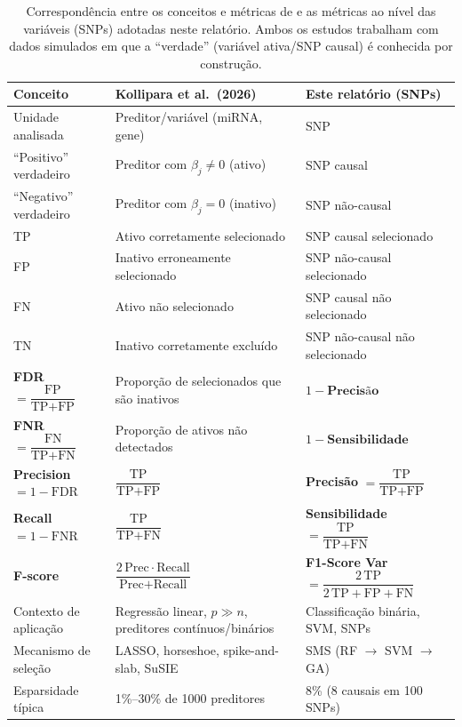 \documentclass[
    12pt,
    a4paper,
    oneside,
    english,
    french,
    spanish,
    brazil
    ]{abntex2}
\renewcommand{\arraystretch}{1.3}
\newcommand{\novo}[1]{\textcolor{corNova}{#1}}
\begin{document}
\begin{table}[H]
\centering
\caption{\novo{Correspondência entre os conceitos e métricas de \citeonline{Kollipara2026} e as métricas ao nível das variáveis (SNPs) adotadas neste relatório. Ambos os estudos trabalham com dados simulados em que a ``verdade'' (variável ativa/SNP causal) é conhecida por construção.}}
\label{tab:analogia_kollipara}
\small
\renewcommand{\arraystretch}{1.4}
\begin{tabular}{L{3.8cm}L{4.8cm}L{4.8cm}}
\hline
\textbf{Conceito} & \textbf{Kollipara et al.\ (2026)} & \textbf{Este relatório (SNPs)} \\
\hline
Unidade analisada & Preditor/variável (miRNA, gene) & SNP \\
\hline
``Positivo'' verdadeiro & Preditor com $\beta_j \neq 0$ (ativo) & SNP causal \\
\hline
``Negativo'' verdadeiro & Preditor com $\beta_j = 0$ (inativo) & SNP não-causal \\
\hline
TP & Ativo corretamente selecionado & SNP causal selecionado \\
\hline
FP & Inativo erroneamente selecionado & SNP não-causal selecionado \\
\hline
FN & Ativo não selecionado & SNP causal não selecionado \\
\hline
TN & Inativo corretamente excluído & SNP não-causal não selecionado \\
\hline
\textbf{FDR} $= \dfrac{\text{FP}}{\text{TP}+\text{FP}}$ & Proporção de selecionados que são inativos & $1 - \textbf{Precisão}$ \\[6pt]
\hline
\textbf{FNR} $= \dfrac{\text{FN}}{\text{TP}+\text{FN}}$ & Proporção de ativos não detectados & $1 - \textbf{Sensibilidade}$ \\[6pt]
\hline
\textbf{Precision} $= 1-\text{FDR}$ & $\dfrac{\text{TP}}{\text{TP}+\text{FP}}$ & \textbf{Precisão} $= \dfrac{\text{TP}}{\text{TP}+\text{FP}}$ \\[6pt]
\hline
\textbf{Recall} $= 1-\text{FNR}$ & $\dfrac{\text{TP}}{\text{TP}+\text{FN}}$ & \textbf{Sensibilidade} $= \dfrac{\text{TP}}{\text{TP}+\text{FN}}$ \\[6pt]
\hline
\textbf{F-score} & $\dfrac{2\,\text{Prec}\cdot\text{Recall}}{\text{Prec}+\text{Recall}}$ & \textbf{F1-Score Var} $= \dfrac{2\,\text{TP}}{2\,\text{TP}+\text{FP}+\text{FN}}$ \\[6pt]
\hline
Contexto de aplicação & Regressão linear, $p \gg n$, preditores contínuos/binários & Classificação binária, SVM, SNPs \\
\hline
Mecanismo de seleção & LASSO, horseshoe, spike-and-slab, SuSIE & SMS (RF $\to$ SVM $\to$ GA) \\
\hline
Esparsidade típica & 1\%–30\% de 1000 preditores & 8\% (8 causais em 100 SNPs) \\
\hline
\end{tabular}
\end{table}
\end{document}
